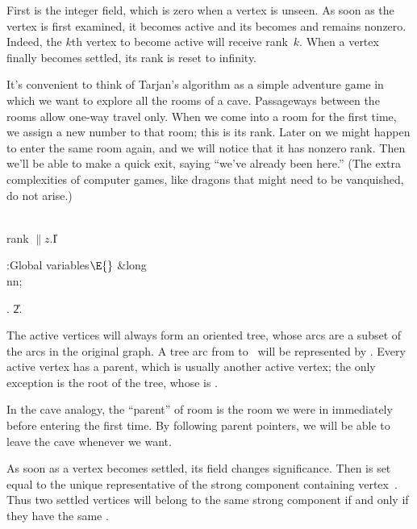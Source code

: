 \fi

First is the integer  field, which is zero when a vertex is
unseen.
As soon as the vertex is first examined, it becomes active and its 
becomes and remains nonzero. Indeed, the $k$th vertex to become active
will receive rank~$k$. When a vertex finally becomes settled, its rank
is reset to infinity.

It's convenient to think of Tarjan's algorithm as a simple adventure
game in which we want to explore all the rooms of a cave. Passageways between
the rooms allow one-way travel only. When we come
into a room for the first time, we assign a new number to that room;
this is its rank. Later on we might happen to enter the same room
again, and we will notice that it has nonzero rank. Then we'll be able
to make a quick exit, saying ``we've already been here.'' (The extra
complexities of computer games, like dragons that might need to be
vanquished, do not arise.)

\Y\B\4\D\\{rank}\5
$\|z.{}$\|I\par
\Y\B\4:Global variables\X${}\E{}$\6
\&{long} \\{nn};\par
{}.
\U2.\fi

The active vertices will always form an oriented tree, whose arcs are
a subset of the arcs in the original graph. A tree arc from  to~
will be represented by . Every active vertex has a
parent, which is usually another active vertex; the only exception is
the root of the tree, whose  is \PB{$\NULL$}.

In the cave analogy, the ``parent'' of room  is the room we were in
immediately before entering  the first time. By following parent
pointers, we will be able to leave the cave whenever we want.

As soon as a vertex becomes settled, its  field changes
significance.  Then  is set equal to the unique
representative of the strong component containing vertex~. Thus
two settled vertices will belong to the same strong component if and only
if they have the same .

